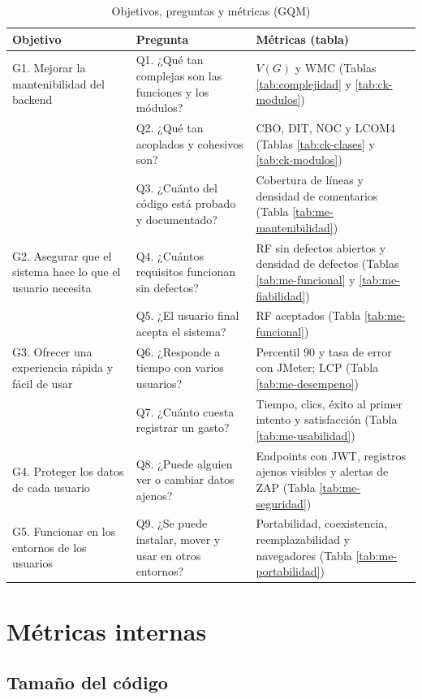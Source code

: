 \begin{table}[H]
\caption{Objetivos, preguntas y métricas (GQM)}
\label{tab:gqm}
\footnotesize
\begin{tabularx}{\linewidth}{L{3.4cm} L{4.6cm} Y}
\toprule
Objetivo & Pregunta & Métricas (tabla) \\
\midrule
G1. Mejorar la mantenibilidad del backend & Q1. ¿Qué tan complejas son las funciones y los módulos? & $V(G)$ y WMC (Tablas \ref{tab:complejidad} y \ref{tab:ck-modulos}) \\
 & Q2. ¿Qué tan acoplados y cohesivos son? & CBO, DIT, NOC y LCOM4 (Tablas \ref{tab:ck-clases} y \ref{tab:ck-modulos}) \\
 & Q3. ¿Cuánto del código está probado y documentado? & Cobertura de líneas y densidad de comentarios (Tabla \ref{tab:me-mantenibilidad}) \\
\midrule
G2. Asegurar que el sistema hace lo que el usuario necesita & Q4. ¿Cuántos requisitos funcionan sin defectos? & RF sin defectos abiertos y densidad de defectos (Tablas \ref{tab:me-funcional} y \ref{tab:me-fiabilidad}) \\
 & Q5. ¿El usuario final acepta el sistema? & RF aceptados (Tabla \ref{tab:me-funcional}) \\
\midrule
G3. Ofrecer una experiencia rápida y fácil de usar & Q6. ¿Responde a tiempo con varios usuarios? & Percentil 90 y tasa de error con JMeter; LCP (Tabla \ref{tab:me-desempeno}) \\
 & Q7. ¿Cuánto cuesta registrar un gasto? & Tiempo, clics, éxito al primer intento y satisfacción (Tabla \ref{tab:me-usabilidad}) \\
\midrule
G4. Proteger los datos de cada usuario & Q8. ¿Puede alguien ver o cambiar datos ajenos? & Endpoints con JWT, registros ajenos visibles y alertas de ZAP (Tabla \ref{tab:me-seguridad}) \\
\midrule
G5. Funcionar en los entornos de los usuarios & Q9. ¿Se puede instalar, mover y usar en otros entornos? & Portabilidad, coexistencia, reemplazabilidad y navegadores (Tabla \ref{tab:me-portabilidad}) \\
\bottomrule
\end{tabularx}
\end{table}

\section{Métricas internas}

\subsection{Tamaño del código}


